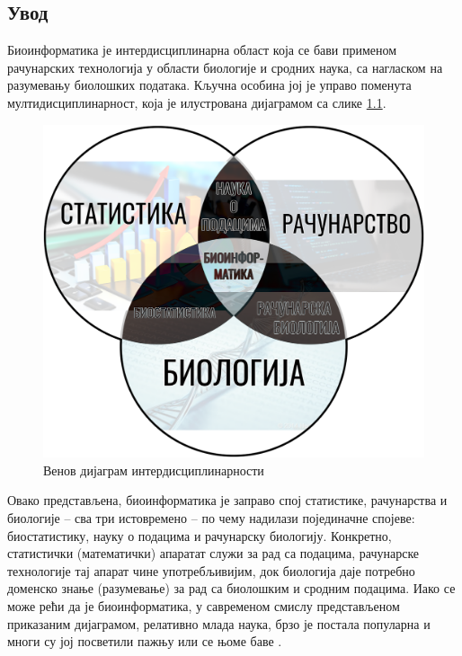 \documentclass[12pt,oneside]{memoir}
\begin{document}
\begin{CJK}{UTF8}{ipxm}
\frontmatter
\naslovna
\komisija
\apstrakt
\tableofcontents*

\mainmatter

\chapter{Увод}
Биоинформатика је интердисциплинарна област која се бави применом рачунарских технологија у области биологије и сродних наука, са нагласком на разумевању биолошких података. Кључна особина јој је управо поменута мултидисциплинарност, која је илустрована дијаграмом са слике \ref{fig:venn}.

\begin{figure}[H]
  \centering
  \includegraphics[width=.71\textwidth]{bioinformatika.png}
  \caption{Венов дијаграм интердисциплинарности}
  \label{fig:venn}
\end{figure}

Овако представљена, биоинформатика је заправо спој статистике, рачунарства и биологије -- сва три истовремено -- по чему надилази појединачне спојеве: биостатистику, науку о подацима и рачунарску биологију. Конкретно, статистички (математички) апаратат служи за рад са подацима, рачунарске технологије тај апарат чине употребљивијим, док биологија даје потребно доменско знање (разумевање) за рад са биолошким и сродним подацима. Иако се може рећи да је биоинформатика, у савременом смислу представљеном приказаним дијаграмом, релативно млада наука, брзо је постала популарна и многи су јој посветили пажњу или се њоме баве \cite{ufpr}.


\end{CJK}
\end{document}
